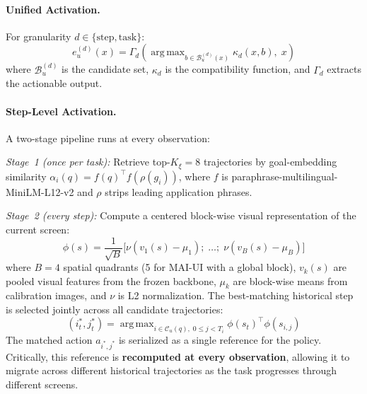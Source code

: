 \documentclass[11pt,a4paper]{article}
\DeclareMathOperator*{\argmax}{arg\,max}
\begin{document}
\paragraph{Unified Activation.}
For granularity $d \in \{\text{step}, \text{task}\}$:
\begin{equation}
e_u^{(d)}(x) = \Gamma_d\!\left(\argmax_{b \in \mathcal{B}_u^{(d)}(x)} \kappa_d(x, b),\; x\right)
\end{equation}
where $\mathcal{B}_u^{(d)}$ is the candidate set, $\kappa_d$ is the compatibility function, and $\Gamma_d$ extracts the actionable output.

\paragraph{Step-Level Activation.}
A two-stage pipeline runs at every observation:

\emph{Stage~1 (once per task):} Retrieve top-$K_\xi{=}8$ trajectories by goal-embedding similarity $\alpha_i(q) = f(q)^\top f(\rho(g_i))$, where $f$ is paraphrase-multilingual-MiniLM-L12-v2 and $\rho$ strips leading application phrases.

\emph{Stage~2 (every step):} Compute a centered block-wise visual representation of the current screen:
\begin{equation}
\phi(s) = \frac{1}{\sqrt{B}}\bigl[\nu(v_1(s) - \mu_1);\; \ldots;\; \nu(v_B(s) - \mu_B)\bigr]
\end{equation}
where $B{=}4$ spatial quadrants (5 for MAI-UI with a global block), $v_k(s)$ are pooled visual features from the frozen backbone, $\mu_k$ are block-wise means from calibration images, and $\nu$ is L2 normalization. The best-matching historical step is selected jointly across all candidate trajectories:
\begin{equation}
(i_t^*, j_t^*) = \argmax_{i \in \mathcal{C}_u(q),\; 0 \leq j < T_i} \phi(s_t)^\top \phi(s_{i,j})
\end{equation}
The matched action $a_{i^*,j^*}$ is serialized as a single reference for the policy. Critically, this reference is \textbf{recomputed at every observation}, allowing it to migrate across different historical trajectories as the task progresses through different screens.
\end{document}
